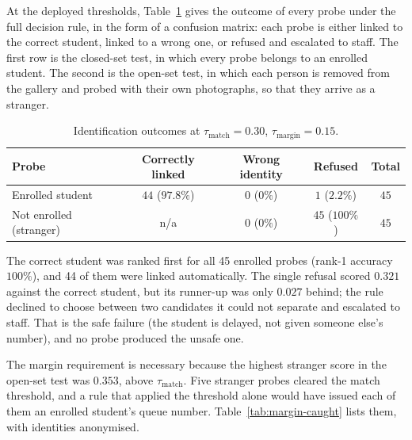 \documentclass{research}
\begin{document}
At the deployed thresholds, Table~\ref{tab:identification-outcomes}
gives the outcome of every probe
under the full decision rule, in the form of a confusion matrix: each
probe is either linked to the correct student, linked to a wrong one,
or refused and escalated to staff. The first row is the closed-set
test, in which every probe belongs to an enrolled student. The second
is the open-set test, in which each person is removed from the gallery
and probed with their own photographs, so that they arrive as a
stranger.

\begin{table}[H]
\centering
\caption{Identification outcomes at $\tau_{\mathrm{match}} = 0.30$,
$\tau_{\mathrm{margin}} = 0.15$.}
\label{tab:identification-outcomes}
\begin{tabular}{lcccc}
\hline
Probe & Correctly linked & Wrong identity & Refused & Total \\
\hline
Enrolled student & $44$ ($97.8\%$) & $0$ ($0\%$) & $1$ ($2.2\%$) & $45$ \\
Not enrolled (stranger) & n/a & $0$ ($0\%$) & $45$ ($100\%$) & $45$ \\
\hline
\end{tabular}
\end{table}

\noindent The correct student was ranked first for all 45 enrolled
probes (rank-1 accuracy $100\%$), and 44 of them were linked
automatically. The single refusal scored $0.321$ against the correct
student, but its runner-up was only $0.027$ behind; the rule declined to
choose between two candidates it could not separate and escalated to
staff. That is the safe failure (the student is delayed, not given
someone else's number), and no probe produced the unsafe one.

The margin requirement is necessary because the highest stranger score
in the open-set test was $0.353$, above $\tau_{\mathrm{match}}$.
Five stranger probes cleared the match threshold, and a rule that
applied the threshold alone would have issued each of them an enrolled
student's queue number. Table~\ref{tab:margin-caught} lists them, with
identities anonymised.
\end{document}
